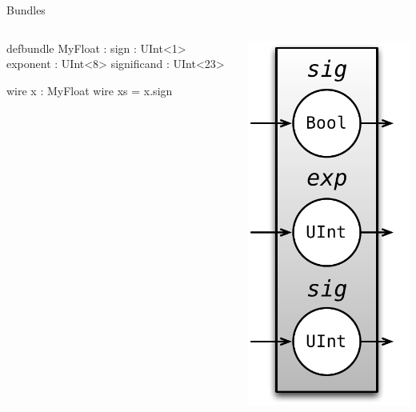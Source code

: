 \documentclass[xcolor=pdflatex,dvipsnames,table]{beamer}
\begin{document}
\begin{frame}[fragile]{Bundles}

\begin{columns}
\begin{stanza}
defbundle MyFloat :
  sign : UInt<1>
  exponent : UInt<8>
  significand : UInt<23>

wire x  : MyFloat
wire xs = x.sign
\end{stanza}


\begin{center}
\includegraphics[height=0.9\textheight]{figs/myfloat.pdf} 
\end{center}

\end{columns}
\end{frame}
\end{document}
